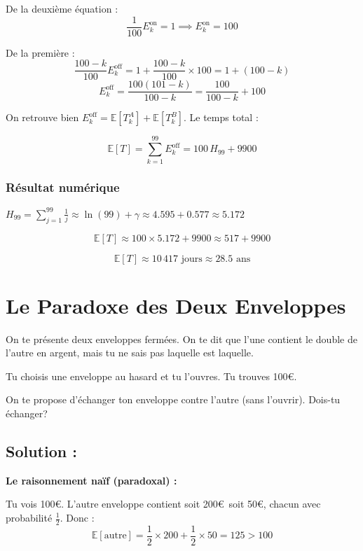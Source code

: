 De la deuxième équation :
\[
\frac{1}{100}E_k^{\text{on}} = 1 \implies E_k^{\text{on}} = 100
\]

De la première :
\[
\frac{100-k}{100}E_k^{\text{off}} = 1 + \frac{100-k}{100}\times 100 = 1 + (100-k)
\]
\[
E_k^{\text{off}} = \frac{100(101-k)}{100-k} = \frac{100}{100-k} + 100
\]

On retrouve bien $E_k^{\text{off}} = \mathbb{E}[T_k^A] + \mathbb{E}[T_k^B]$. Le temps total :

\[
\mathbb{E}[T] = \sum_{k=1}^{99} E_k^{\text{off}} = 100\,H_{99} + 9900
\]

\bigskip

\subsubsection*{Résultat numérique}

$H_{99} = \displaystyle\sum_{j=1}^{99}\frac{1}{j} \approx \ln(99) + \gamma \approx 4.595 + 0.577 \approx 5.172$

\[
\mathbb{E}[T] \approx 100 \times 5.172 + 9900 \approx 517 + 9900
\]

\[
\boxed{\mathbb{E}[T] \approx 10\,417 \text{ jours} \approx 28.5 \text{ ans}}
\]

\section{Le Paradoxe des Deux Enveloppes}

\begin{exerciseBox}
On te présente deux enveloppes fermées. On te dit que l'une contient le double de l'autre en argent, mais tu ne sais pas laquelle est laquelle.

Tu choisis une enveloppe au hasard et tu l'ouvres. Tu trouves 100\euro.

On te propose d'échanger ton enveloppe contre l'autre (sans l'ouvrir). Dois-tu échanger?
\end{exerciseBox}



\subsection*{Solution :}

\textbf{Le raisonnement naïf (paradoxal) :}

Tu vois 100\euro. L'autre enveloppe contient soit 200\euro\ soit 50\euro, chacun avec probabilité $\frac{1}{2}$. Donc :
\[
\mathbb{E}[\text{autre}] = \frac{1}{2}\times 200 + \frac{1}{2}\times 50 = 125 > 100
\]

